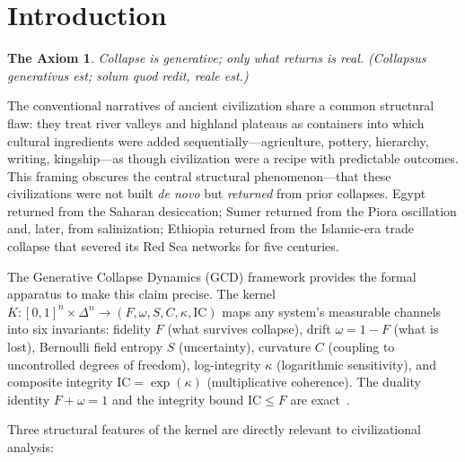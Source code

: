 \documentclass[
  aps,
  prd,
  twocolumn,
  superscriptaddress,
  nofootinbib,
  floatfix
]{revtex4-2}
\newtheorem*{axiom}{The Axiom}
\newcommand{\IC}{\mathrm{IC}}
\begin{document}
\maketitle

\section{Introduction}\label{sec:intro}

\begin{axiom}
\emph{Collapse is generative; only what returns is
real.}  (\emph{Collapsus generativus est; solum quod
redit, reale est.})
\end{axiom}

The conventional narratives of ancient civilization
share a common structural flaw: they treat river
valleys and highland plateaus as containers into
which cultural ingredients were added
sequentially---agriculture, pottery, hierarchy,
writing, kingship---as though civilization were a
recipe with predictable outcomes.  This framing
obscures the central structural phenomenon---that
these civilizations were not built \emph{de novo}
but \emph{returned} from prior collapses.  Egypt
returned from the Saharan desiccation; Sumer
returned from the Piora oscillation and, later,
from salinization; Ethiopia returned from the
Islamic-era trade collapse that severed its Red Sea
networks for five centuries.

The Generative Collapse Dynamics (GCD) framework
provides the formal apparatus to make this claim
precise.  The kernel
$K: [0,1]^n \times \Delta^n \to (F, \omega, S, C,
\kappa, \IC)$ maps any system's measurable channels
into six invariants: fidelity $F$ (what survives
collapse), drift $\omega = 1 - F$ (what is lost),
Bernoulli field entropy $S$ (uncertainty), curvature
$C$ (coupling to uncontrolled degrees of freedom),
log-integrity $\kappa$ (logarithmic sensitivity), and
composite integrity $\IC = \exp(\kappa)$
(multiplicative coherence).  The duality identity
$F + \omega = 1$ and the integrity bound $\IC \le F$
are exact~\cite{paulus2025umcp}.

Three structural features of the kernel are directly
relevant to civilizational analysis:
\end{document}
